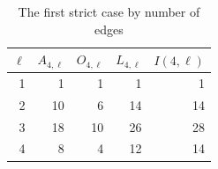 \begin{table}[htbp]\centering
\caption{The first strict case by number of edges}\label{tab:coefficients}
\begin{tabular}{r r r r r}\toprule
$\ell$ & $A_{4,\ell}$ & $O_{4,\ell}$ & $L_{4,\ell}$ & $I(4,\ell)$ \\\midrule
1 & 1 & 1 & 1 & 1 \\
2 & 10 & 6 & 14 & 14 \\
3 & 18 & 10 & 26 & 28 \\
4 & 8 & 4 & 12 & 14 \\
\bottomrule\end{tabular}\end{table}
